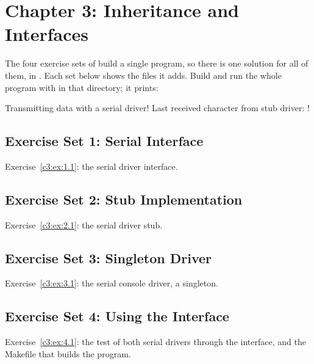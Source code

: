 
\section{Chapter 3: Inheritance and Interfaces}
\label{sol:sec:c3}
The four exercise sets of  build a single program, so there is one
solution for all of them, in . Each set below shows the files
it adds. Build and run the whole program with  in that directory; it prints:

\begin{console}
Transmitting data with a serial driver!
Last received character from stub driver: !
\end{console}

\subsection{Exercise Set 1: Serial Interface}
\label{sol:set:c3.1}
Exercise~\ref{c3:ex:1.1}: the serial driver interface.


\subsection{Exercise Set 2: Stub Implementation}
\label{sol:set:c3.2}
Exercise~\ref{c3:ex:2.1}: the serial driver stub.


\subsection{Exercise Set 3: Singleton Driver}
\label{sol:set:c3.3}
Exercise~\ref{c3:ex:3.1}: the serial console driver, a singleton.


\subsection{Exercise Set 4: Using the Interface}
\label{sol:set:c3.4}
Exercise~\ref{c3:ex:4.1}: the test of both serial drivers through the interface, and the Makefile
that builds the program.

